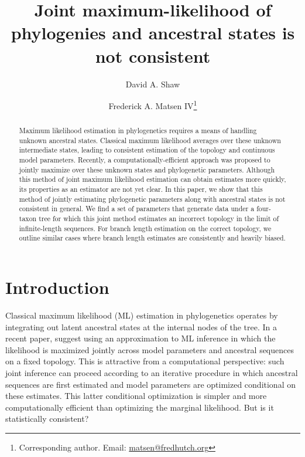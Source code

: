 \documentclass[11pt]{article}
\title{Joint maximum-likelihood of phylogenies and ancestral states is not consistent}
\author[1]{David A. Shaw}
\author[1]{Frederick A. Matsen IV\thanks{Corresponding author. Email: \url{matsen@fredhutch.org}}}
\affil[1]{Computational Biology Program, Fred Hutchinson Cancer Research Center\\ Seattle, WA, USA}
\date{}
\begin{document}
\renewcommand{\arraystretch}{1.2} %

\maketitle

\begin{abstract}
Maximum likelihood estimation in phylogenetics requires a means of handling unknown ancestral states.
Classical maximum likelihood averages over these unknown intermediate states, leading to consistent estimation of the topology and continuous model parameters.
Recently, a computationally-efficient approach was proposed to jointly maximize over these unknown states and phylogenetic parameters.
Although this method of joint maximum likelihood estimation can obtain estimates more quickly, its properties as an estimator are not yet clear.
In this paper, we show that this method of jointly estimating phylogenetic parameters along with ancestral states is not consistent in general.
We find a set of parameters that generate data under a four-taxon tree for which this joint method estimates an incorrect topology in the limit of infinite-length sequences.
For branch length estimation on the correct topology, we outline similar cases where branch length estimates are consistently and heavily biased.
\end{abstract}

\newpage

\section*{Introduction}

Classical maximum likelihood (ML) estimation in phylogenetics operates by integrating out latent ancestral states at the internal nodes of the tree.
In a recent paper, \citet{Sagulenko2017-jo} suggest using an approximation to ML inference in which the likelihood is maximized jointly across model parameters and ancestral sequences on a fixed topology.
This is attractive from a computational perspective: such joint inference can proceed according to an iterative procedure in which ancestral sequences are first estimated and model parameters are optimized conditional on these estimates.
This latter conditional optimization is simpler and more computationally efficient than optimizing the marginal likelihood.
But is it statistically consistent?
\end{document}
